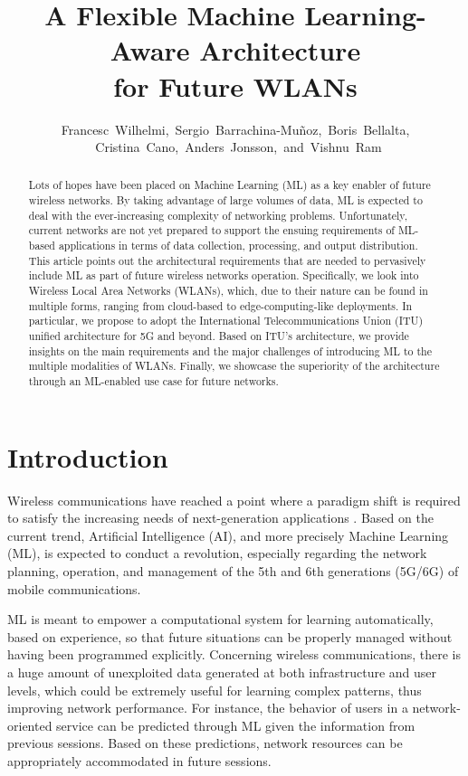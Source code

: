 \documentclass{article}
\begin{document}
\setcounter{page}{162}
\title{A Flexible Machine Learning-Aware Architecture\\ for Future WLANs}
\author{Francesc~Wilhelmi,~Sergio~Barrachina-Mu\~noz,~Boris~Bellalta,\\~Cristina~Cano,~Anders~Jonsson,~and~Vishnu~Ram}
\date{ }
\maketitle

\begin{abstract}
Lots of hopes have been placed on Machine Learning (ML) as a key enabler of future wireless networks. By taking advantage of large volumes of data, ML is expected to deal with the ever-increasing complexity of networking problems. Unfortunately, current networks are not yet prepared to support the ensuing requirements of ML-based applications in terms of data collection, processing, and output distribution. This article points out the architectural requirements that are needed to pervasively include ML as part of future wireless networks operation. Specifically, we look into Wireless Local Area Networks (WLANs), which, due to their nature can be found in multiple forms, ranging from cloud-based to edge-computing-like deployments. In particular, we propose to adopt the International Telecommunications Union (ITU) unified architecture for 5G and beyond. Based on ITU's architecture, we provide insights on the main requirements and the major challenges of introducing ML to the multiple modalities of WLANs. Finally, we showcase the superiority of the architecture through an ML-enabled use case for future networks.
\end{abstract}

\section{Introduction}
Wireless communications have reached a point where a paradigm shift is required to satisfy the increasing needs of next-generation applications \cite{osseiran2014scenarios}. Based on the current trend, Artificial Intelligence (AI), and more precisely Machine Learning (ML), is expected to conduct a revolution, especially regarding the network planning, operation, and management of the 5th and 6th generations (5G/6G) of mobile communications. 

ML is meant to empower a computational system for learning automatically, based on experience, so that future situations can be properly managed without having been programmed explicitly. Concerning wireless communications, there is a huge amount of unexploited data generated at both infrastructure and user levels, which could be extremely useful for learning complex patterns, thus improving network performance. For instance, the behavior of users in a network-oriented service can be predicted through ML given the information from previous sessions. Based on these predictions, network resources can be appropriately accommodated in future sessions.
\end{document}

